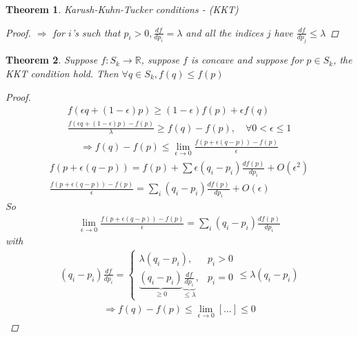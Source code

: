 \documentclass[twoside]{article}
\newtheorem{theorem}{Theorem}[section]
\theoremstyle{definition} %
\def\R{\mathbb{R}}
\begin{document}
\begin{appendices}
\begin{theorem}{Karush-Kuhn-Tucker conditions - (KKT)}
\begin{proof}
  $\Rightarrow$ for $i$'s such that $p_i > 0, \frac{df}{dp_i} = \lambda$ and all the indices $j$ have $\frac{df}{dp_j} \leq \lambda$
\end{proof}

\end{theorem}

\begin{theorem}
  Suppose $f: S_k \rightarrow \R$, suppose $f$ is concave and suppose for $p \in S_k$, the KKT condition hold. Then $\forall q \in S_k, f(q) \leq f(p) $

  \begin{proof}
    \begin{align*}
      f(\epsilon q + (1 - \epsilon)p) \geq (1 - \epsilon) f(p) + \epsilon f(q) \\
      \frac{f(\epsilon q + (1 - \epsilon)p) - f(p)}{\lambda} \geq f(q) - f(p), \quad \forall 0 < \epsilon \leq 1
    \end{align*}
    \begin{align*}
      \Rightarrow f(q) - f(p) \leq \lim_{\epsilon \to 0} \frac{f(p + \epsilon(q - p)) - f(p)}{\epsilon}
    \end{align*}
    \begin{align*}
      f(p + \epsilon (q - p)) = f(p) + \sum \epsilon(q_i - p_i) \frac{df(p)}{dp_i} + O(\epsilon^2) \\
      \frac{f(p + \epsilon(q - p)) - f(p)}{\epsilon} = \sum_{i} (q_i - p_i) \frac{d f(p)}{d p_i} + O(\epsilon)
    \end{align*}
    So
    \begin{align*}
      \lim_{\epsilon \to 0} \frac{f(p + \epsilon(q - p)) - f(p)}{\epsilon} = \sum_i (q_i - p_i) \frac{d f(p)}{d p_i}
    \end{align*}
    with
    \begin{align*}
      (q_i - p_i) \frac{df}{dp_i} =
      \left\{
      \begin{array}{ll}
        \lambda (q_i - p_i), & p_i > 0 \\
        \underbrace{(q_i - p_i)}_{\geq 0} \underbrace{\frac{df}{dp_i}}_{\leq \lambda}, & p_i = 0
      \end{array}
      \right.
      \leq \lambda (q_i - p_i)
    \end{align*}
    \begin{align*}
      \Rightarrow f(q) - f(p) \leq \lim_{\epsilon \to 0} [...] \leq 0
    \end{align*}
  \end{proof}
\end{theorem}


\end{appendices}
\end{document}
